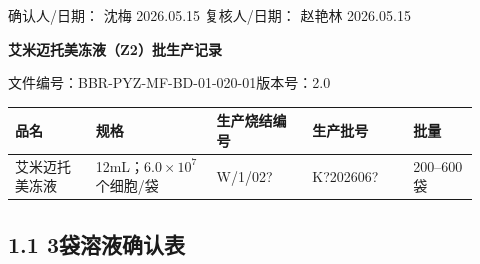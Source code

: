 \documentclass[UTF8,10pt,a4paper,fontset=fandol]{ctexart}
\newcommand{\fieldvalue}[1]{#1}
\newcommand{\handwritten}[1]{#1}
\begin{document}
\vspace{0.4em}

确认人/日期：
\fieldvalue{\handwritten{沈梅}}
\quad
\fieldvalue{\handwritten{2026.05.15}}
\qquad
复核人/日期：
\fieldvalue{\handwritten{赵艳林}}
\quad
\fieldvalue{\handwritten{2026.05.15}}

\newpage

\begin{center}
\textbf{艾米迈托美冻液（Z2）批生产记录}
\end{center}

\noindent
文件编号：BBR-PYZ-MF-BD-01-020-01\quad 版本号：2.0

\begin{center}
\begin{tabular}{|p{0.16\linewidth}|p{0.24\linewidth}|p{0.19\linewidth}|p{0.20\linewidth}|p{0.13\linewidth}|}
\hline
品名 & 规格 & 生产烧结编号 & 生产批号 & 批量\\
\hline
艾米迈托美冻液 & 12mL；$6.0\times10^7$个细胞/袋 &
\fieldvalue{\handwritten{W/1/02?}} &
\fieldvalue{\handwritten{K?202606?}} &
200--600袋\\
\hline
\end{tabular}
\end{center}

\subsection*{1.1 3袋溶液确认表}
\end{document}
